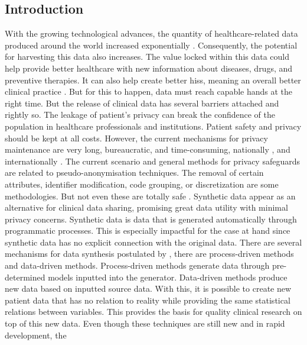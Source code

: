 
\subsection{Introduction}

With the growing technological advances, the quantity of healthcare-related data produced around the world increased exponentially \cite{choi_generating_2017,henry_adoption_2016}.
Consequently, the potential for harvesting this data also increases. The value locked within
this data could help provide better healthcare with new information about diseases,
drugs, and preventive therapies. It can also help create better \acp{his}, meaning an overall better clinical practice \cite{ISI:000502534100049}. But for this to happen, data must reach capable hands at the right time.
But the release of clinical data has several barriers attached and rightly so. The leakage of patient’s privacy can break the confidence of the population in healthcare
professionals and institutions. Patient safety
and privacy should be kept at all costs. However, the current mechanisms for privacy maintenance are very long, bureaucratic, and time-consuming, nationally \cite{comissao_nacional_protecao_de_dados_principios_2015}, and internationally \cite{office_for_civil_rights_guidance_2013}. The current scenario and general methods for privacy safeguards are related to pseudo-anonymisation techniques.
The removal of certain attributes, identifier modification, code grouping, or discretization are some methodologies. But not even these are totally safe \cite{el_emam_systematic_2011}.
Synthetic data appear as an alternative for clinical data sharing, promising great data
utility with minimal privacy concerns. Synthetic data is data that is generated automatically through programmatic processes. This is especially impactful for the case at hand
since synthetic data has no explicit connection with the original data. There are several
mechanisms for data synthesis postulated by \cite{goncalves_generation_2020}, there are
process-driven methods and data-driven methods. Process-driven methods generate
data through pre-determined models inputted into the generator. Data-driven methods
produce new data based on inputted source data. With this, it is possible to create new
patient data that has no relation to reality while providing the same statistical relations
between variables. This provides the basis for quality clinical research on top of this
new data. Even though these techniques are still new and in rapid development, the
